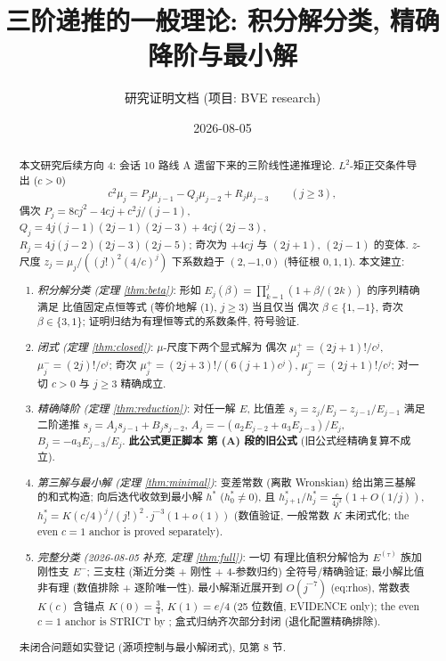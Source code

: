 \documentclass[UTF8]{ctexart}
\title{三阶递推的一般理论: 积分解分类, 精确降阶与最小解}
\author{研究证明文档 (项目: BVE research)}
\date{2026-08-05}
\begin{document}
\maketitle

\begin{abstract}
本文研究后续方向 4: 会话 10 路线 A 遗留下来的三阶线性递推理论.
$L^2$-矩正交条件导出 ($c>0$)
\begin{equation}
	c^2 \mu_j = P_j \mu_{j-1} - Q_j \mu_{j-2} + R_j \mu_{j-3}
	\qquad (j \geq 3),
\end{equation}
偶次 $P_j = 8cj^2 - 4cj + c^2 j/(j-1)$, $Q_j = 4j(j-1)(2j-1)(2j-3) + 4cj(2j-3)$,
$R_j = 4j(j-2)(2j-3)(2j-5)$; 奇次为 $+4cj$ 与 $(2j+1)$, $(2j-1)$ 的变体.
$z$-尺度 $z_j = \mu_j/((j!)^2 (4/c)^j)$ 下系数趋于 $(2,-1,0)$
(特征根 $0, 1, 1$). 本文建立:
\begin{enumerate}
	\item \emph{积分解分类 (定理 \ref{thm:beta})}: 形如
		$E_j(\beta) = \prod_{k=1}^j (1+\beta/(2k))$ 的序列精确满足
		比值固定点恒等式 (等价地解 (1), $j \geq 3$) 当且仅当
		偶次 $\beta \in \{1, -1\}$, 奇次 $\beta \in \{3, 1\}$;
		证明归结为有理恒等式的系数条件, 符号验证.
	\item \emph{闭式 (定理 \ref{thm:closed})}: $\mu$-尺度下两个显式解为
		偶次 $\mu_j^+ = (2j+1)!/c^j$, $\mu_j^- = (2j)!/c^j$;
		奇次 $\mu_j^+ = (2j+3)!/(6(j+1)c^j)$, $\mu_j^- = (2j+1)!/c^j$;
		对一切 $c > 0$ 与 $j \geq 3$ 精确成立.
	\item \emph{精确降阶 (定理 \ref{thm:reduction})}: 对任一解 $E$,
		比值差 $s_j = z_j/E_j - z_{j-1}/E_{j-1}$ 满足二阶递推
		$s_j = A_j s_{j-1} + B_j s_{j-2}$, $A_j = -(a_2 E_{j-2} + a_3 E_{j-3})/E_j$,
		$B_j = -a_3 E_{j-3}/E_j$. \textbf{此公式更正脚本
		 第 (A) 段的旧公式} (旧公式经精确复算不成立).
	\item \emph{第三解与最小解 (定理 \ref{thm:minimal})}: 变差常数 (离散 Wronskian)
		给出第三基解的和式构造; 向后迭代收敛到最小解 $h^*$ ($h^*_0 \neq 0$),
		且 $h^*_{j+1}/h^*_j = \frac{c}{4j^2}(1+O(1/j))$,
		$h^*_j = K(c/4)^j/(j!)^2 \cdot j^{-3}(1+o(1))$ (数值验证,
		一般常数 $K$ 未闭式化; the even $c=1$ anchor is proved separately).
	\item \emph{完整分类 (2026-08-05 补充, 定理 \ref{thm:full})}: 一切
		有理比值积分解恰为 $E^{(\tau)}$ 族加刚性支 $E^-$; 三支柱
		(渐近分类 + 刚性 + 4-参数归约) 全符号/精确验证; 最小解比值
		非有理 (数值排除 + 逐阶唯一性). 最小解渐近展开到 $O(j^{-7})$
		(eq:rhos), 常数表 $K(c)$ 含锚点 $K(0)=\tfrac34$, $K(1)=e/4$
		(25 位数值, EVIDENCE only); the even $c=1$ anchor is STRICT by
		; 盒式归纳齐次部分封闭
		(退化配置精确排除).
\end{enumerate}
未闭合问题如实登记 (源项控制与最小解闭式), 见第 8 节.
\end{abstract}
\end{document}
